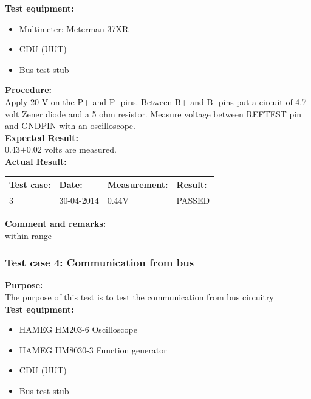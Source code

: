 \textbf{Test equipment:}
\begin{itemize}
\item Multimeter: Meterman 37XR
\item CDU (UUT)
\item Bus test stub
\end{itemize}

\textbf{Procedure:}\\
Apply 20 V on the P+ and P- pins. Between B+ and B- pins put a circuit of 4.7 volt Zener diode and a 5 ohm resistor. Measure voltage between REFTEST pin and GNDPIN with an oscilloscope.\\

\textbf{Expected Result:}\\
0.43$\pm$0.02 volts are measured.\\

\textbf{Actual Result:}\\
\begin{table}[H]
\centering
\begin{tabular}{|p{2cm}|p{2cm}|p{3cm}|p{2cm}|}\hline
\textbf{Test case:} & \textbf{Date:} & \textbf{Measurement:} & \textbf{Result:} \\ \hline
3 & 30-04-2014 & 0.44V & PASSED \\ \hline
\end{tabular}
\end{table}

\textbf{Comment and remarks:}\\
within range\\

\subsubsection{Test case 4: Communication from bus}
\textbf{Purpose:}\\
The purpose of this test is to test the communication from bus circuitry\\

\textbf{Test equipment:}
\begin{itemize}
\item HAMEG HM203-6 Oscilloscope
\item HAMEG HM8030-3 Function generator
\item CDU (UUT)
\item Bus test stub
\end{itemize}

